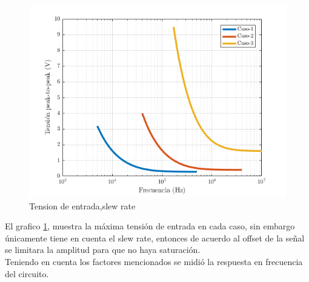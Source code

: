 \documentclass[../../main.tex]{subfiles}
\begin{document}
\begin{figure}[H]
\centering
\includegraphics[width=1\textwidth]{imagenes/slew-rate-inv.png}
\caption{Tension de entrada,slew rate} \label{fig=srInv}
\end{figure}

El grafico \ref{fig=srInv}, muestra la máxima tensión de entrada en cada caso, sin embargo únicamente tiene en cuenta el slew rate, entonces de acuerdo al offset de la señal se limitara la amplitud para que no haya saturación.
\\
Teniendo en cuenta los factores mencionados se midió la respuesta en frecuencia del circuito.
\end{document}
